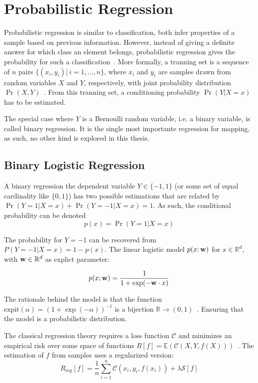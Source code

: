 
\section{Probabilistic Regression}

Probabilistic regression is similar to classification, both infer properties of
a sample based on previous information. However, instead of giving a definite
answer for which class an element belongs, probabilistic regression gives the
probability for such a classification~\cite{jaakkola1999probabilistic}. More
formally, a tranning set is a sequence of $n$ pairs
$\{(x_i,y_i)|~i=1,\ldots,n\}$, where $x_i$ and $y_i$ are samples drawn from
random variables $X$ and $Y$, respectively, with joint probability distribution
$\Pr(X,Y)$~\cite{friedman2001elements}. From this tranning set, a conditioning
probability $\Pr(Y|X=x)$ has to be estimated.

The special case where $Y$ is a Bernoulli random variable, i.e. a binary
variable, is called binary regression. It is the single most importante
regression for mapping, as such, no other kind is explored in this thesis. 

\subsection{Binary Logistic Regression} 

A binary regression the dependent variable $Y\in\{-1,1\}$
(or some set of equal cardinality like $\{0,1\}$) has two
possible estimations that are related by $\Pr(Y=1|X=x)+\Pr(Y=-1|X=x)=1$. As
such, the conditional probability can be denoted
\begin{equation*}
p(x) = \Pr(Y=1|X=x) 
\end{equation*}

The probability for $Y=-1$ can be recovered from $P(Y=-1|X=x)=1-p(x)$. The
linear logistic model $p(x;\mathrm{\mathbf{w}})$ for $x\in\mathbb{R}^d$, with
$\mathrm{\mathbf{w}}\in\mathbb{R}^d$ as explict parameter:

\begin{equation}
\label{eq:std_linear_logistic}
p(x;\mathrm{\mathbf{w}}) = \frac{1}{1+\exp(-\mathrm{\mathbf{w}}\cdot x)}
\end{equation}

The rationale behind the model is that the function
$\text{expit}(\alpha)=(1+\exp(-\alpha))^{-1}$ is a bijection
$\mathbb{R}\to(0,1)$~\cite{friedman2001elements}. Ensuring that the model is a
probabilistic distribution.

The classical regression theory requires a loss function $\mathscr{C}$ and
minimizes an empirical risk over some space of functions
$R[f]=\mathbb{E}(\mathscr{C}(X,Y,f(X)))$~\cite{jaakkola1999probabilistic}. The
estimation of $f$ from samples uses a regularized version:
\begin{equation}
R_{\text{reg}}[f] =
\frac{1}{n}\sum_{i=1}^n\mathscr{C}(x_i,y_i,f(x_i))+\lambda\mathcal{S}[f]
\end{equation}

